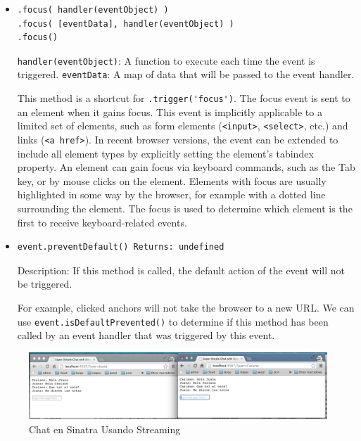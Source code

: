 \begin{itemize}
\item
\begin{verbatim}
.focus( handler(eventObject) )
.focus( [eventData], handler(eventObject) )
.focus()
\end{verbatim}
\verb|handler(eventObject)|: A function to execute each time the event is triggered.
\verb|eventData|: A map of data that will be passed to the event handler.

This method is a shortcut for \verb|.trigger('focus')|.
The focus event is sent to an element when it gains focus. 
This event is implicitly applicable to a limited set of elements, such as form elements 
(\verb|<input>|, \verb|<select>|, etc.) and links (\verb|<a href>|). In recent browser
versions, the event can be extended to include all element types
by explicitly setting the element's tabindex property. An element
can gain focus via keyboard commands, such as the Tab key, or by
mouse clicks on the element.
Elements with focus are usually highlighted in some way by the
browser, for example with a dotted line surrounding the element.
The focus is used to determine which element is the first to receive
keyboard-related events.

\item
\begin{verbatim}
event.preventDefault() Returns: undefined
\end{verbatim}
Description: If this method is called, the default action of the
event will not be triggered.

For example, clicked anchors will not take the browser to a new
URL. We can use \verb|event.isDefaultPrevented()| to determine if this
method has been called by an event handler that was triggered by
this event.
\end{itemize}



\begin{figure}[htb]
\begin{center}
\includegraphics[scale=0.7]{sinatra/chapter2fundamentos/sinatra_chat.png}
\end{center}
\label{figure:sinatrachat}
\caption{Chat en Sinatra Usando Streaming}
\end{figure}

